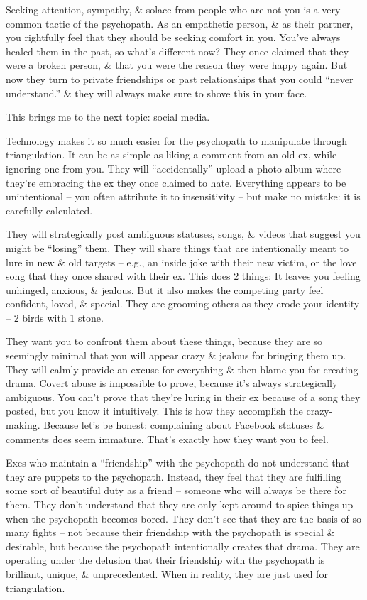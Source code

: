 \documentclass{article}
\numberwithin{equation}{section}
\begin{document}
Seeking attention, sympathy, \& solace from people who are not you is a very common tactic of the psychopath. As an empathetic person, \& as their partner, you rightfully feel that they should be seeking comfort in you. You've always healed them in the past, so what's different now? They once claimed that they were a broken person, \& that you were the reason they were happy again. But now they turn to private friendships or past relationships that you could ``never understand.'' \& they will always make sure to shove this in your face.

This brings me to the next topic: social media.

Technology makes it so much easier for the psychopath to manipulate through triangulation. It can be as simple as liking a comment from an old ex, while ignoring one from you. They will ``accidentally'' upload a photo album where they're embracing the ex they once claimed to hate. Everything appears to be unintentional -- you often attribute it to insensitivity -- but make no mistake: it is carefully calculated.

They will strategically post ambiguous statuses, songs, \& videos that suggest you might be ``losing'' them. They will share things that are intentionally meant to lure in new \& old targets -- e.g., an inside joke with their new victim, or the love song that they once shared with their ex. This does 2 things: It leaves you feeling unhinged, anxious, \& jealous. But it also makes the competing party feel confident, loved, \& special. They are grooming others as they erode your identity -- 2 birds with 1 stone.

They want you to confront them about these  things, because they are so seemingly minimal that you will appear crazy \& jealous for bringing them up. They will calmly provide an excuse for everything \& then blame you for creating drama. Covert abuse is impossible to prove, because it's always strategically ambiguous. You can't prove that they're luring in their ex because of a song they posted, but you know it intuitively. This is how they accomplish the crazy-making. Because let's be honest: complaining about Facebook statuses \& comments does seem immature. That's exactly how they want you to feel.

Exes who maintain a ``friendship'' with the psychopath do not understand that they are puppets to the psychopath. Instead, they feel that they are fulfilling some sort of beautiful duty as a friend -- someone who will always be there for them. They don't understand that they are only kept around to spice things up when the psychopath becomes bored. They don't see that they are the basis of so many fights -- not because their friendship with the psychopath is special \& desirable, but because the psychopath intentionally creates that drama. They are operating under the delusion that their friendship with the psychopath is brilliant, unique, \& unprecedented. When in reality, they are just used for triangulation.
\end{document}
